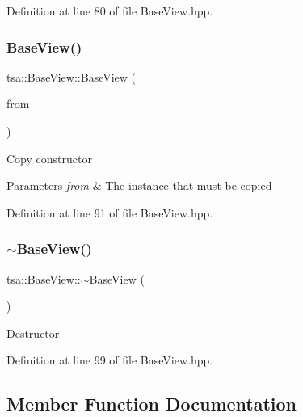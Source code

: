 Definition at line 80 of file Base\+View.\+hpp.

\mbox{\label{classtsa_1_1_base_view_a21d825daa5ede62830f69e0ea7275008}} 
\subsubsection{\texorpdfstring{Base\+View()}{BaseView()}\hspace{0.1cm}{\footnotesize\ttfamily [2/2]}}
{\footnotesize\ttfamily tsa\+::\+Base\+View\+::\+Base\+View (\begin{DoxyParamCaption}\item[{const \hyperlink{classtsa_1_1_base_view}{Base\+View} \&}]{from }\end{DoxyParamCaption})\hspace{0.3cm}{\ttfamily [inline]}}

Copy constructor


\begin{DoxyParams}{Parameters}
{\em from} & The instance that must be copied \\
\hline
\end{DoxyParams}


Definition at line 91 of file Base\+View.\+hpp.

\mbox{\label{classtsa_1_1_base_view_ad3e2d3032a8efe2bd2dc7a9a9c7636d6}} 
\subsubsection{\texorpdfstring{$\sim$\+Base\+View()}{~BaseView()}}
{\footnotesize\ttfamily tsa\+::\+Base\+View\+::$\sim$\+Base\+View (\begin{DoxyParamCaption}{ }\end{DoxyParamCaption})\hspace{0.3cm}{\ttfamily [inline]}}

Destructor 

Definition at line 99 of file Base\+View.\+hpp.



\subsection{Member Function Documentation}
\mbox{\label{classtsa_1_1_base_view_ac6e0354eb1ec24205ff893440ff561b9}} 
